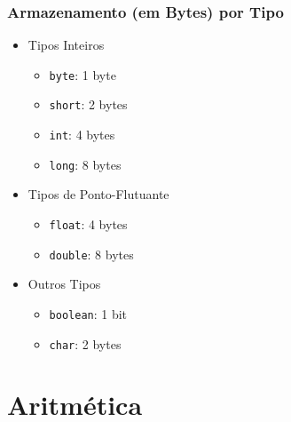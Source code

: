 \documentclass[xcolor={dvipsnames,table},aspectratio=169]{beamer}
\begin{document}
\begin{frame}\frametitle{Armazenamento (em Bytes) por Tipo}
\begin{itemize}
	\item Tipos Inteiros
	\begin{itemize}
		\item \texttt{byte}: 1 byte
		\item \texttt{short}: 2 bytes
		\item \texttt{int}: 4 bytes
		\item \texttt{long}: 8 bytes
	\end{itemize}
	\item Tipos de Ponto-Flutuante
	\begin{itemize}
		\item \texttt{float}: 4 bytes
		\item \texttt{double}: 8 bytes
	\end{itemize}
	\item Outros Tipos
	\begin{itemize}
		\item \texttt{boolean}: 1 bit
		\item \texttt{char}: 2 bytes
	\end{itemize}
\end{itemize}
\end{frame}

\section{Aritmética}
\end{document}
